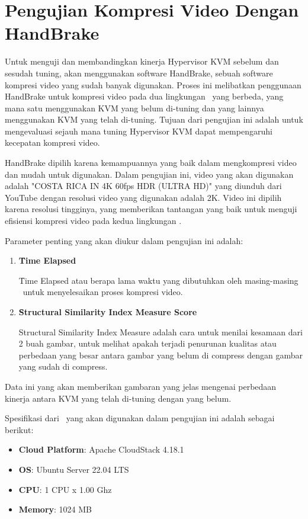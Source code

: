 \section{Pengujian Kompresi Video Dengan HandBrake}
Untuk menguji dan membandingkan kinerja Hypervisor KVM sebelum dan sesudah tuning, {\saya} akan menggunakan software HandBrake, sebuah software kompresi video yang sudah banyak digunakan. Proses ini melibatkan penggunaan HandBrake untuk kompresi video pada dua lingkungan \vm\ yang berbeda, yang mana satu menggunakan KVM yang belum di-tuning dan yang lainnya menggunakan KVM yang telah di-tuning. Tujuan dari pengujian ini adalah untuk mengevaluasi sejauh mana tuning Hypervisor KVM dapat mempengaruhi kecepatan kompresi video.

HandBrake dipilih karena kemampuannya yang baik dalam mengkompresi video dan mudah untuk digunakan\cite{Folgar2014-eg}. Dalam pengujian ini, video yang akan digunakan adalah "COSTA RICA IN 4K 60fps HDR (ULTRA HD)" yang diunduh dari YouTube dengan resolusi video yang digunakan adalah 2K. Video ini dipilih karena resolusi tingginya, yang memberikan tantangan yang baik untuk menguji efisiensi kompresi video pada kedua lingkungan \vm. 

Parameter penting yang akan diukur dalam pengujian ini adalah: 

\begin{enumerate}
	\item \textbf{\f{Time Elapsed}}
	
	\f{Time Elapsed} atau berapa lama waktu yang dibutuhkan oleh masing-masing \vm\ untuk menyelesaikan proses kompresi video.
		
	\item \textbf{\f{Structural Similarity Index Measure Score}}
	
	Structural Similarity Index Measure adalah cara untuk menilai kesamaan dari 2 buah gambar, untuk melihat apakah terjadi penurunan kualitas atau perbedaan yang besar antara gambar yang belum di compress dengan gambar yang sudah di compress.
\end{enumerate}


Data ini yang akan memberikan gambaran yang jelas mengenai perbedaan kinerja antara KVM yang telah di-tuning dengan yang belum.

Spesifikasi dari \vm\ yang akan digunakan dalam pengujian ini adalah sebagai berikut:
\begin{itemize}
	\item \textbf{Cloud Platform}: Apache CloudStack 4.18.1
	\item \textbf{OS}: Ubuntu Server 22.04 LTS
	\item \textbf{CPU}: 1 CPU x 1.00 Ghz
	\item \textbf{Memory}: 1024 MB
\end{itemize} 

